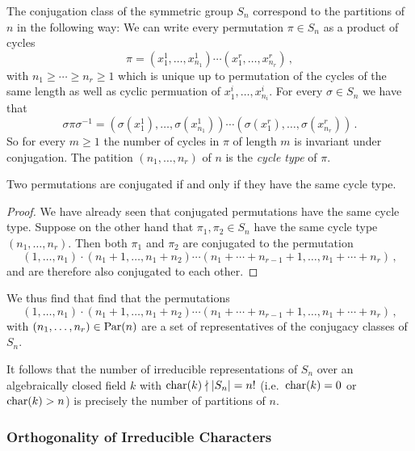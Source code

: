 \begin{example}
  \label{example: conjugacy classes of symmetric group}
  The conjugation class of the symmetric group $S_n$ correspond to the partitions of $n$ in the following way:
  We can write every permutation $\pi \in S_n$ as a product of cycles
  \[
      \pi
    = \left( x^1_1, \dotsc, x^1_{n_1} \right)
      \dotsm
      \left( x^r_1, \dotsc, x^r_{n_r} \right) \,,
  \]
  with $n_1 \geq \dotsb \geq n_r \geq 1$ which is unique up to permutation of the cycles of the same length as well as cyclic permuation of $x^i_1, \dotsc, x^i_{n_i}$.
  For every $\sigma \in S_n$ we have that
  \[
      \sigma \pi \sigma^{-1}
    = \left( \sigma(x^1_1), \dotsc, \sigma(x^1_{n_1}) \right)
      \dotsm
      \left( \sigma(x^r_1), \dotsc, \sigma(x^r_{n_r}) \right) \,.
  \]
  So for every $m \geq 1$ the number of cycles in $\pi$ of length $m$ is invariant under conjugation.
  The patition $(n_1, \dotsc, n_r)$ of $n$ is the \emph{cycle type} of $\pi$.
  
  \begin{claim}
    Two permutations are conjugated if and only if they have the same cycle type.
  \end{claim}
  
  \begin{proof}
    We have already seen that conjugated permutations have the same cycle type.
    Suppose on the other hand that $\pi_1, \pi_2 \in S_n$ have the same cycle type $(n_1, \dotsc, n_r)$.
    Then both $\pi_1$ and $\pi_2$ are conjugated to the permutation
    \[
              (1, \dotsc, n_1)
      \cdot   (n_1 + 1, \dotsc, n_1 + n_2)
      \dotsm  (n_1 + \dotsb + n_{r-1} + 1, \dotsc, n_1 + \dotsb + n_r) \,,
    \]
    and are therefore also conjugated to each other.
  \end{proof}
  We thus find that find that the permutations
  \[
            (1, \dotsc, n_1)
    \cdot   (n_1 + 1, \dotsc, n_1 + n_2)
    \dotsm  (n_1 + \dotsb + n_{r-1} + 1, \dotsc, n_1 + \dotsb + n_r) \,,
  \]
  with $(n_1, \dotsc, n_r) \in \operatorname{Par}(n)$ are a set of representatives of the conjugacy classes of $S_n$.
  
  It follows that the number of irreducible representations of $S_n$ over an algebraically closed field $k$ with $\operatorname{char}(k) \nmid |S_n| = n!$ (i.e.\ $\operatorname{char}(k) = 0$ or $\operatorname{char}(k) > n$) is precisely the number of partitions of $n$.
\end{example}



\subsubsection{Orthogonality of Irreducible Characters}


